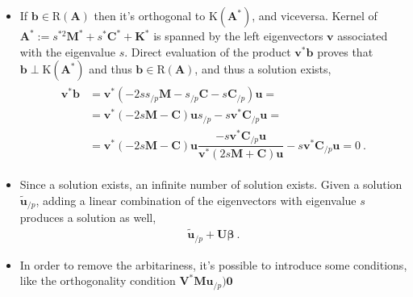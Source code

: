 \documentclass[letterpaper,10pt,english]{jupyterBook}
\begin{document}
\begin{itemize}
\item {} 
\sphinxAtStartPar
If \(\mathbf{b} \in \text{R}(\mathbf{A})\) then it’s orthogonal to \(\text{K}(\mathbf{A}^*)\), and viceversa. Kernel of \(\mathbf{A}^* := s^{* 2} \mathbf{M}^* + s^* \mathbf{C}^* + \mathbf{K}^*\) is spanned by the left eigenvectors \(\mathbf{v}\) associated with the eigenvalue \(s\). Direct evaluation of the product \(\mathbf{v}^* \mathbf{b}\) proves that \(\mathbf{b} \perp \text{K}(\mathbf{A}^*)\) and thus \(\mathbf{b} \in \text{R}(\mathbf{A})\), and thus a solution exists,
\begin{equation*}
\begin{split}\begin{aligned}
    \mathbf{v}^* \mathbf{b} 
    & = \mathbf{v}^* \left( - 2 s s_{/p} \mathbf{M} - s_{/p} \mathbf{C} - s \mathbf{C}_{/p} \right) \mathbf{u} = \\
    & = \mathbf{v}^* ( - 2 s \mathbf{M} - \mathbf{C} ) \mathbf{u} s_{/p} - s \mathbf{v}^* \mathbf{C}_{/p} \mathbf{u} = \\
    & = \mathbf{v}^* ( - 2 s \mathbf{M} - \mathbf{C} ) \mathbf{u} \dfrac{-s \mathbf{v}^* \mathbf{C}_{/p} \mathbf{u}}{\mathbf{v}^* ( 2 s \mathbf{M} + \mathbf{C}) \mathbf{u}} - s \mathbf{v}^* \mathbf{C}_{/p} \mathbf{u} = 0 \ .
  \end{aligned}\end{split}
\end{equation*}
\item {} 
\sphinxAtStartPar
Since a solution exists, an infinite number of solution exists. Given a solution \(\widetilde{\mathbf{u}}_{/p}\), adding a linear combination of the eigenvectors with eigenvalue \(s\) produces a solution as well,
\begin{equation*}
\begin{split}\widetilde{\mathbf{u}}_{/p} + \mathbf{U} \boldsymbol\beta \ .\end{split}
\end{equation*}
\item {} 
\sphinxAtStartPar
In order to remove the arbitariness, it’s possible to introduce some conditions, like the orthogonality condition \(\mathbf{V}^* \mathbf{M} \mathbf{u}_{/p} ) \mathbf{0}\)


\end{itemize}
\end{document}
